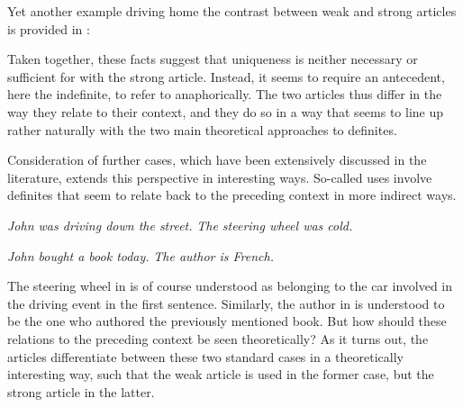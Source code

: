 \documentclass[output=paper
,modfonts
,nonflat]{langscibook}
\begin{document}
Yet another example driving
home the contrast between weak and strong articles is provided in :


Taken together, these facts suggest that uniqueness is neither
necessary or sufficient for  with the strong
article. Instead, it seems to require an antecedent, here the
indefinite, to refer to anaphorically. The two articles thus differ in
the way they relate to their context, and they do so in a way that
seems to line up rather naturally with the two main theoretical approaches
to definites. 

Consideration of further cases, which have been extensively discussed
in the literature, extends this perspective in interesting ways. So-called  uses \citep{Clark1975,Hawkins1978,Prince1981} involve
definites that seem to relate back to the preceding context in more
indirect ways. \newpage

\begin{exe}
\ex\label{ex:schwarz:9}
\begin{xlist}
\ex \textit{John was driving down the street.} 
\ex \textit{The steering wheel was cold.}
\end{xlist}
\ex\label{ex:schwarz:10}
\begin{xlist}
\ex \textit{John bought a book today.} 
\ex \textit{The author is French.}
\end{xlist}
\end{exe}

The steering wheel in  is of course understood as
belonging to the car involved in the driving event in the first
sentence. Similarly, the author in  is understood to
be the one who authored the previously mentioned book. But how should
these relations to the preceding context be seen theoretically? As it turns out, the  articles differentiate between these two
standard cases in a theoretically interesting way, such that the weak article is used in the former case,
but the strong article in the latter.
\end{document}
